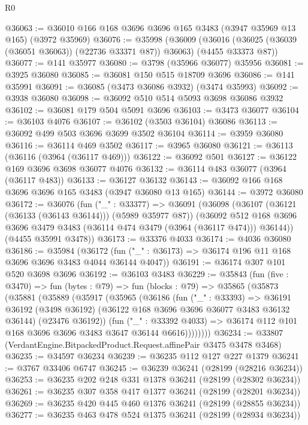 \begin{lexlean}{R0}
\begin{coremodule}
@36063 := @36010 @166 @168 @3696 @3696 @165 @3483 (@3947 @35969 @13 @165) (@3972 @35969)
@36076 := @35998
    (@36009
      (@36016 (@36025 (@36039 (@36051 @36063)) (@22736 @33371 @87)) @36063)
      (@4455 @33373 @87))
@36077 := @141 @35977
@36080 := @3798 (@35966 @36077) @35956
@36081 := @3925 @36080
@36085 := @36081 @150 @515 @18709 @3696
@36086 := @141 @35991
@36091 := @36085 (@3473 @36086 @3932) (@3474 @35993)
@36092 := @3938 @36080
@36098 := @36092 @510 @514 @5093 @3698 @36086 @3932
@36102 := @36081 @179 @504 @5091 @3696
@36103 := @3473 @36077
@36104 := @36103 @4076
@36107 := @36102 (@3503 @36104) @36086
@36113 := @36092 @499 @503 @3696 @3699 @3502 @36104
@36114 := @3959 @36080
@36116 := @36114 @469 @3502
@36117 := @3965 @36080
@36121 := @36113 (@36116 (@3964 (@36117 @469)))
@36122 := @36092 @501
@36127 := @36122 @169 @3696 @3698 @36077 @4076
@36132 := @36114 @483 @36077 (@3964 (@36117 @483))
@36133 := @36127 @36132
@36143 := @36092 @166 @168 @3696 @3696 @165 @3483 (@3947 @36080 @13 @165)
@36144 := @3972 @36080
@36172 := @36076
    (fun ("_" : @33377) =>
    @36091
      (@36098
        (@36107 (@36121 (@36133 (@36143 @36144))) (@5989 @35977 @87))
        (@36092 @512 @168 @3696 @3696 @3479 @3483 (@36114 @474 @3479 (@3964 (@36117 @474))) @36144))
      (@4455 @35991 @3478))
@36173 := @33376 @4033
@36174 := @4036 @36080
@36186 := @35984
    (@36172 (fun ("_" : @36173) => @36174 @196 @11 @168 @3696 @3696 @3483 @4044 @36144 @4047))
@36191 := @36174 @307 @101 @520 @3698 @3696
@36192 := @36103 @3483
@36229 := @35843
    (fun (five : @3470) =>
    fun (bytes : @79) =>
    fun (blocks : @79) =>
    @35865
      (@35873
        (@35881
          (@35889
            (@35917
              (@35965
                (@36186
                  (fun ("_" : @33393) =>
                  @36191
                    @36192
                    (@3498 @36192)
                    (@36122 @168 @3696 @3696 @36077 @3483 @36132 @36144)
                    (@23476 @36192))
                  (fun ("_" : @33392 @4033) =>
                  @36174 @112 @101 @168 @3696 @3696 @3483 @3647 @36144 @6616))))))))
@36234 := @33807 (VerdantEngine.BitpackedProduct.Request.affinePair @3475 @3478 @3468)
@36235 := @34597 @36234
@36239 := @36235 @112 @127 @227 @1379
@36241 := @3767 @33406 @6747
@36245 := @36239 @36241 (@28199 (@28216 @36234))
@36253 := @36235 @202 @248 @331 @1378 @36241 (@28199 (@28302 @36234))
@36261 := @36235 @307 @358 @417 @1377 @36241 (@28199 (@28201 @36234))
@36269 := @36235 @420 @445 @460 @1376 @36241 (@28199 (@28855 @36234))
@36277 := @36235 @463 @478 @524 @1375 @36241 (@28199 (@28934 @36234))

\end{coremodule}
\end{lexlean}

